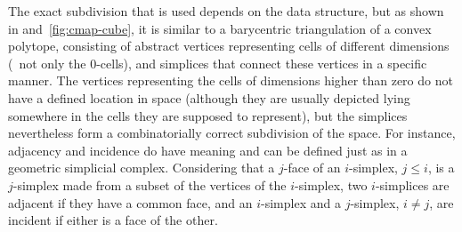 The exact subdivision that is used depends on the data structure, but as shown in  and~\ref{fig:cmap-cube}, it is similar to a barycentric triangulation of a convex polytope, consisting of abstract vertices representing cells of different dimensions (\ie\ not only the 0-cells), and simplices that connect these vertices in a specific manner.
The vertices representing the cells of dimensions higher than zero do not have a defined location in space (although they are usually depicted lying somewhere in the cells they are supposed to represent), but the simplices nevertheless form a combinatorially correct subdivision of the space.
For instance, adjacency and incidence do have meaning and can be defined just as in a geometric simplicial complex.
Considering that a $j$-face of an $i$-simplex, $j \leq i$, is a $j$-simplex made from a subset of the vertices of the $i$-simplex, two $i$-simplices are adjacent if they have a common face, and an $i$-simplex and a $j$-simplex, $i \neq j$, are incident if either is a face of the other.
